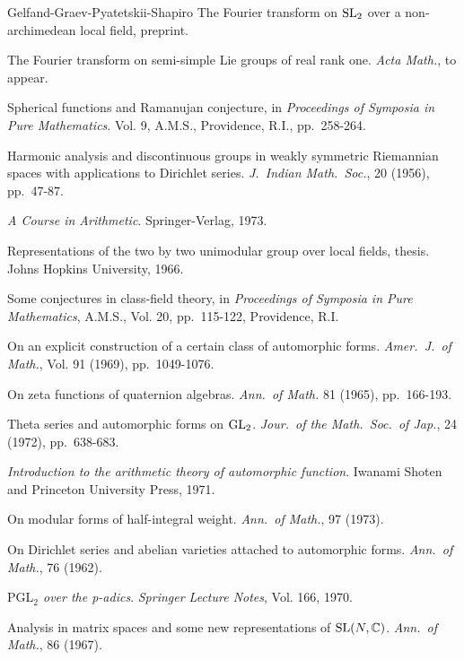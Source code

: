 \begin{thebibliography}{Gelfand-Graev-Pyatetskii-Shapiro}
 The Fourier transform on $\operatorname{SL}_2$ over a non-archimedean local field, preprint.

 The Fourier transform on semi-simple Lie groups of real rank one. \emph{Acta Math.}, to appear.

 Spherical functions and Ramanujan conjecture, in \emph{Proceedings of Symposia in Pure Mathematics}. Vol. 9, A.M.S., Providence, R.I., pp.\ 258-264.

 Harmonic analysis and discontinuous groups in weakly symmetric Riemannian spaces with applications to Dirichlet series. \emph{J.\ Indian Math.\ Soc.}, 20 (1956), pp.\ 47-87.

 \emph{A Course in Arithmetic}. Springer-Verlag, 1973.

 Representations of the two by two unimodular group over local fields, thesis. Johns Hopkins University, 1966.

 Some conjectures in class-field theory, in \emph{Proceedings of Symposia in Pure Mathematics}, A.M.S., Vol. 20, pp.\ 115-122, Providence, R.I.

 On an explicit construction of a certain class of automorphic forms. \emph{Amer.\ J.\ of Math.}, Vol. 91 (1969), pp.\ 1049-1076.

 On zeta functions of quaternion algebras. \emph{Ann.\ of Math.} 81 (1965), pp.\ 166-193.

 Theta series and automorphic forms on $\operatorname{GL}_2$. \emph{Jour.\ of the Math.\ Soc.\ of Jap.}, 24 (1972), pp.\ 638-683.

 \emph{Introduction to the arithmetic theory of automorphic function}. Iwanami Shoten and Princeton University Press, 1971.

 On modular forms of half-integral weight. \emph{Ann.\ of Math.}, 97 (1973).

 On Dirichlet series and abelian varieties attached to automorphic forms. \emph{Ann.\ of Math.}, 76 (1962).

 \emph{$\mathrm{PGL}_2$ over the p-adics}. \emph{Springer Lecture Notes}, Vol. 166, 1970.

 Analysis in matrix spaces and some new representations of $\operatorname{SL}(N,\mathbb{C})$. \emph{Ann.\ of Math.}, 86 (1967).


\end{thebibliography}

